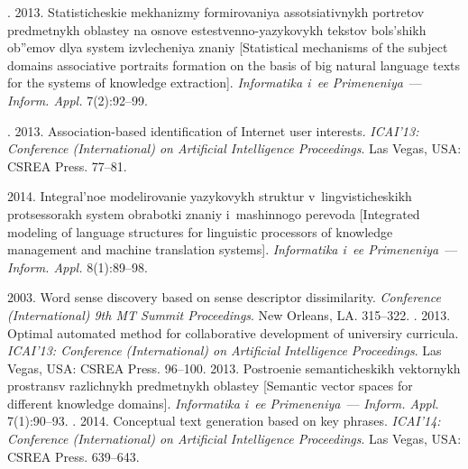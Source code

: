   \begin{multicols}{2}

\renewcommand{\bibname}{\protect\rmfamily References}

{\small\frenchspacing
 {%
 \begin{thebibliography}{99}
. 2013. Sta\-ti\-sti\-che\-skie mekhanizmy
formirovaniya assotsiativnykh portretov predmetnykh oblastey na osnove
estestvenno-yazykovykh tekstov bols'shikh ob''emov dlya system izvlecheniya
znaniy [Statistical mechanisms of the subject domains associative portraits formation on the basis of big natural language texts for the systems of knowledge extraction].
\textit{Informatika i~ee Primeneniya}~--- \textit{Inform. Appl.} 7(2):92--99.

. 2013. Association-based
identification of Internet user interests. \textit{ICAI'13: Conference (International)
on Artificial Intelligence Proceedings}. Las Vegas, USA: CSREA Press. 77--81.

\vspace*{-4pt}

 2014. Integral'noe modelirovanie yazykovykh struktur
v~lingvisticheskikh protsessorakh system obrabotki znaniy i~mashinnogo
perevoda [Integrated modeling of language structures for linguistic processors of
knowledge management and machine translation systems]. \textit{Informatika i~ee
Primeneniya}~--- \textit{Inform. Appl.} 8(1):89--98.

 2003. Word sense discovery based on sense descriptor
dissimilarity. \textit{Conference (International) 9th MT Summit Proceedings}.
New Orleans, LA. 315--322.
. 2013. Optimal automated method for
collaborative development of universiry curricula. \textit{ICAI'13: Conference
(International) on Artificial Intelligence Proceedings}. Las Vegas, USA: CSREA
Press. 96--100.
 2013. Postroenie semanticheskikh vektornykh prostransv
razlichnykh predmetnykh oblastey [Semantic vector spaces for different knowledge
domains]. \textit{Informatika i~ee Primeneniya}~--- \textit{Inform. Appl.}
7(1):90--93.  %
. 2014. Conceptual text
generation based on key phrases. \textit{ICAI'14: Conference (International) on
Artificial Intelligence Proceedings}. Las Vegas, USA: CSREA Press. 639--643.


\end{thebibliography}}}
\end{multicols}
